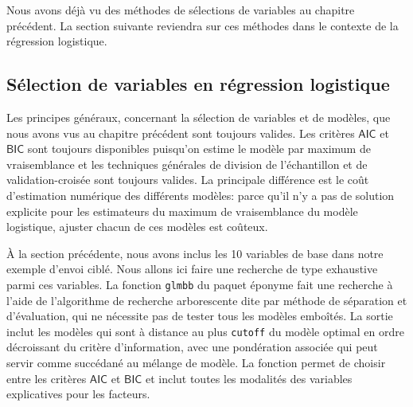 \documentclass[
  11pt,
  letterpaper,
]{scrbook}
\theoremstyle{definition}
\theoremstyle{remark}
\begin{document}
Nous avons déjà vu des méthodes de sélections de variables au chapitre
précédent. La section suivante reviendra sur ces méthodes dans le
contexte de la régression logistique.

\subsection{Sélection de variables en régression
logistique}\label{suxe9lection-de-variables-en-ruxe9gression-logistique}

Les principes généraux, concernant la sélection de variables et de
modèles, que nous avons vus au chapitre précédent sont toujours valides.
Les critères \(\mathsf{AIC}\) et \(\mathsf{BIC}\) sont toujours
disponibles puisqu'on estime le modèle par maximum de vraisemblance et
les techniques générales de division de l'échantillon et de
validation-croisée sont toujours valides. La principale différence est
le coût d'estimation numérique des différents modèles: parce qu'il n'y a
pas de solution explicite pour les estimateurs du maximum de
vraisemblance du modèle logistique, ajuster chacun de ces modèles est
coûteux.

À la section précédente, nous avons inclus les 10 variables de base dans
notre exemple d'envoi ciblé. Nous allons ici faire une recherche de type
exhaustive parmi ces variables. La fonction \texttt{glmbb} du paquet
éponyme fait une recherche à l'aide de l'algorithme de recherche
arborescente dite par méthode de séparation et d'évaluation, qui ne
nécessite pas de tester tous les modèles emboîtés. La sortie inclut les
modèles qui sont à distance au plus \texttt{cutoff} du modèle optimal en
ordre décroissant du critère d'information, avec une pondération
associée qui peut servir comme succédané au mélange de modèle. La
fonction permet de choisir entre les critères \(\mathsf{AIC}\) et
\(\mathsf{BIC}\) et inclut toutes les modalités des variables
explicatives pour les facteurs.
\end{document}
